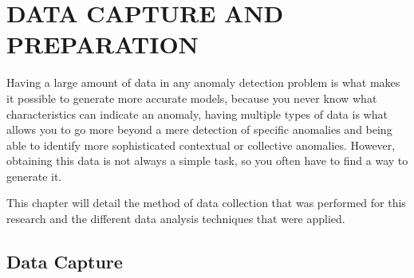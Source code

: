 
\chapter{\uppercase{DATA CAPTURE AND PREPARATION}}
\label{Capitulo 3}

Having a large amount of data in any anomaly detection problem is what makes it possible to generate more accurate models, because you never know what characteristics can indicate an anomaly, having multiple types of data is what allows you to go more beyond a mere detection of specific anomalies and being able to identify more sophisticated contextual or collective anomalies. However, obtaining this data is not always a simple task, so you often have to find a way to generate it.

\vspace{5mm} %

This chapter will detail the method of data collection that was performed for this research and the different data analysis techniques that were applied.

\section{Data Capture} \label{cap:CapDatos}

